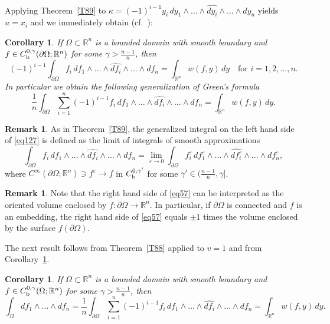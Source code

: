 \documentclass[intlimits,12pt,reqno]{amsart}
\newcommand{\R}{\mathbb R}
\newcommand{\eps}{\varepsilon}
\numberwithin{equation}{section}
\newtheorem{corollary}[theorem]{Corollary}
\theoremstyle{definition}
\newtheorem{remark}[theorem]{Remark}
\begin{document}
Applying Theorem~\ref{T89} to 
$\kappa=(-1)^{i-1}y_i\, dy_1\wedge\ldots\wedge\widehat{dy_i}\wedge\ldots\wedge dy_n$ yields
$u=x_i$ and we immediately obtain (cf.\ \cite[Lemma~2.3]{LZ}):
\begin{corollary}
\label{T25}
If $\Omega\subset\R^n$ is a bounded domain with smooth boundary and $f\in C_{\rm b}^{0,\gamma}(\partial\Omega;\R^n)$ for some $\gamma>\frac{n-1}{n}$, then
\begin{equation}
\label{eq127}
(-1)^{i-1}\int_{\partial\Omega} f_i\, df_1\wedge\ldots\wedge\widehat{df_i}\wedge\ldots\wedge df_n=
\int_{\R^n} w(f,y)\, dy
\quad
\text{for $i=1,2,\ldots,n$.}
\end{equation}
In particular we obtain the following generalization of Green's formula
\begin{equation}
\label{eq57}
\frac{1}{n}\int_{\partial\Omega} \sum_{i=1}^n (-1)^{i-1}f_i\, df_1\wedge\ldots\wedge\widehat{df_i}\wedge\ldots\wedge df_n=
\int_{\R^n}w(f,y)\, dy.
\end{equation}
\end{corollary}
\begin{remark}
As in Theorem~\ref{T89}, the generalized integral on the left hand side of \eqref{eq127} is defined as the limit of integrals of smooth approximations
$$
\int_{\partial\Omega} f_i\, df_1\wedge\ldots\wedge\widehat{df_i}\wedge\ldots\wedge df_n=
\lim_{\eps\to 0}\int_{\partial\Omega} f_i^\eps\, df_1^\eps\wedge\ldots\wedge\widehat{df_i^\eps}\wedge\ldots\wedge df^\eps_n,
$$
where $C^\infty(\partial\Omega;\R^n)\ni f^\eps\to f$ in $C_{\rm b}^{0,\gamma'}$ for some $\gamma'\in (\frac{n-1}{n},\gamma]$.
\end{remark}
\begin{remark}
Note that the right hand side of \eqref{eq57} can be interpreted as the oriented volume enclosed by $f:\partial\Omega\to\R^n$. In particular, if $\partial\Omega$ is connected and $f$ is an embedding, the right hand side of \eqref{eq57} equals $\pm 1$ times the volume enclosed by the surface $f(\partial\Omega)$.
\end{remark}
The next result follows from  Theorem~\ref{T88} applied to $v=1$ and from  Corollary~\ref{T25}.
\begin{corollary}
\label{T93}
If $\Omega\subset\R^n$ is a bounded domain with smooth boundary and $f\in C_{\rm b}^{0,\gamma}(\Omega;\R^n)$ for some $\gamma>\frac{n-1}{n}$, then
$$
\int_\Omega df_1\wedge\ldots\wedge df_n=
\frac{1}{n}\int_{\partial\Omega} \sum_{i=1}^n (-1)^{i-1}f_i\, df_1\wedge\ldots\wedge\widehat{df_i}\wedge\ldots\wedge df_n=
\int_{\R^n}w(f,y)\, dy.
$$
\end{corollary}
\end{document}
